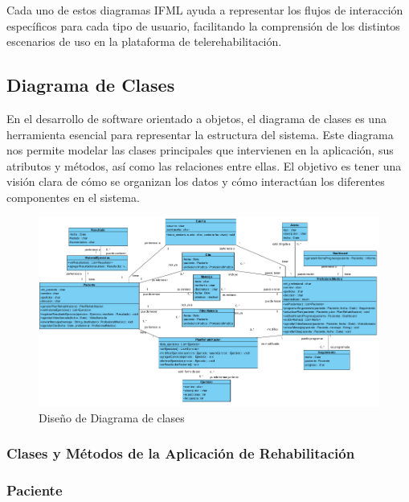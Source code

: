 \documentclass{article}
\begin{document}
Cada uno de estos diagramas IFML ayuda a representar los flujos de interacción específicos para cada tipo de usuario, facilitando la comprensión de los distintos escenarios de uso en la plataforma de telerehabilitación.

\subsection{Diagrama de Clases}

En el desarrollo de software orientado a objetos, el diagrama de clases es una herramienta esencial para representar la estructura del sistema. Este diagrama nos permite modelar las clases principales que intervienen en la aplicación, sus atributos y métodos, así como las relaciones entre ellas. El objetivo es tener una visión clara de cómo se organizan los datos y cómo interactúan los diferentes componentes en el sistema. 

\begin{figure}
	\begin{center} 
		\includegraphics[width=1\textwidth]{images/diagrama_clases.png}
		\caption{Diseño de Diagrama de clases}
		\label{fig:DiagClases}
	\end{center}
\end{figure}
\vspace{5cm}


\subsubsection*{Clases y Métodos de la Aplicación de Rehabilitación}

\subsubsection*{Paciente}
\end{document}
